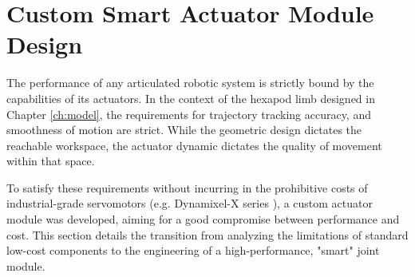 \chapter{Custom Smart Actuator Module Design}
\label{ch:servomotor}

The performance of any articulated robotic system is strictly bound by the capabilities of its actuators.
In the context of the hexapod limb designed in Chapter \ref{ch:model}, the requirements for
trajectory tracking accuracy, and smoothness of motion are strict. While the geometric design dictates
the reachable workspace, the actuator dynamic dictates the quality of movement within that space.

To satisfy these requirements without incurring in the prohibitive costs of industrial-grade servomotors
(e.g. Dynamixel-X series \cite{robotis_dynamixel_x}), a custom actuator module was developed, aiming for a good
compromise between performance and cost. This section details the transition from analyzing the limitations of
standard low-cost components to the engineering of a high-performance, "smart" joint module.







